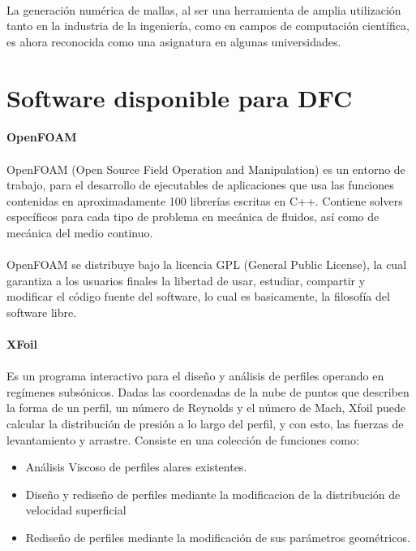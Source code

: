 \documentclass[letterpaper, openright, 12pt]{book}
\begin{document}
    \paragraph*{}
    La generación numérica de mallas, al ser una herramienta de amplia
    utilización tanto en la industria de la ingeniería, como en campos de
    computación científica, es ahora reconocida como una asignatura en algunas
    universidades.\cite{liseikin1999grid}

    \section{Software disponible para DFC}
    \paragraph*{OpenFOAM}
    \paragraph*{}
    OpenFOAM (Open Source Field Operation and Manipulation) es un entorno de
    trabajo, para el desarrollo de ejecutables de aplicaciones que usa las
    funciones contenidas en aproximadamente 100 librerías escritas en C++.
    Contiene solvers específicos para cada tipo de problema en mecánica de
    fluidos, así como de mecánica del medio continuo.\cite{openfoam}

    \paragraph*{}
    OpenFOAM se distribuye bajo la licencia GPL (General Public License), la
    cual garantiza a los usuarios finales la libertad de usar, estudiar,
    compartir y modificar el código fuente del software, lo cual es
    basicamente, la filosofía del software libre.

    \paragraph*{XFoil}
    \paragraph*{}
    Es un programa interactivo para el diseño y análisis de perfiles operando
    en regímenes subsónicos. Dadas las coordenadas de la nube de puntos que
    describen la forma de un perfil, un número de Reynolds y el número de Mach,
    Xfoil puede calcular la distribución de presión a lo largo del perfil, y
    con esto, las fuerzas de levantamiento y arrastre. Consiste en una
    colección de funciones como:
    \begin{itemize}
        \item Análisis Viscoso de perfiles alares existentes.
        \item Diseño y rediseño de perfiles mediante la
            modificacion de la distribución de velocidad
            superficial
        \item Rediseño de perfiles mediante la modificación de
            sus parámetros geométricos.
    \end{itemize}
    \cite{xfoil}
\end{document}
